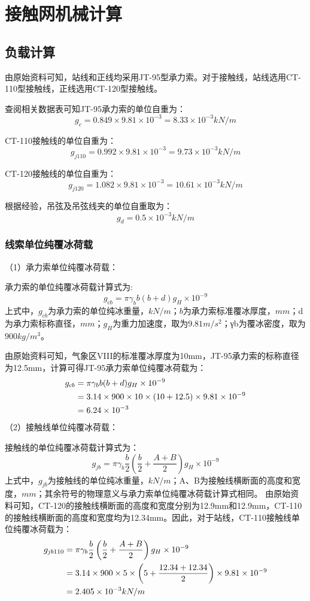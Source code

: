 \chapter{接触网机械计算}

\section{负载计算}
由原始资料可知，站线和正线均采用JT-95型承力索。对于接触线，站线选用CT-110型接触线，正线选用CT-120型接触线。

查阅相关数据表可知JT-95承力索的单位自重为：
$$
g_c=0.849\times 9.81\times 10^{-3}=8.33\times 10^{-3}\mathrm{ }k{{N}/{m}}
$$

CT-110接触线的单位自重为：
$$
g_{j110}=0.992\times 9.81\times 10^{-3}=9.73\times 10^{-3}\mathrm{ }k{{N}/{m}}
$$

CT-120接触线的单位自重为：
$$
g_{j120}=1.082\times 9.81\times 10^{-3}=10.61\times 10^{-3}\mathrm{ }k{{N}/{m}}
$$

根据经验，吊弦及吊弦线夹的单位自重取为：
$$
g_d=0.5\times 10^{-3}k{{N}/{m}}
$$

\subsection{线索单位纯覆冰荷载}
（1）承力索单位纯覆冰荷载：

承力索的单位纯覆冰荷载计算式为:
$$
g_{cb}=\pi \gamma _bb(b+d)g_H\times 10^{-9}
$$
上式中，$g_{cb}$为承力索的单位纯冰重量，$kN/m$；$b$为承力索标准覆冰厚度，$mm$；$ $d为承力索标称直径，$mm$；$g_H$为重力加速度，取为$9.81m/s^2$；γb为覆冰密度，取为$900kg/m^3$。

由原始资料可知，气象区VIII的标准覆冰厚度为10mm，JT-95承力索的标称直径为12.5mm，计算可得JT-95承力索单位纯覆冰荷载为：
\begin{align}
	g_{cb}&=\pi \gamma _bb(b+d)g_H\times 10^{-9}\notag
	\\
	&=3.14\times 900\times 10\times \left( 10+12.5 \right) \times 9.81\times 10^{-9}\notag
	\\
	&=6.24\times 10^{-3}\notag
\end{align}
（2）接触线单位纯覆冰荷载：

接触线的单位纯覆冰荷载计算式为：
$$
g_{jb}=\pi \gamma _b\frac{b}{2}(\frac{b}{2}+\frac{A+B}{2})g_H\times 10^{-9}
$$
上式中，$g_{jb}$为接触线的单位纯冰重量，$kN/m$；A、B为接触线横断面的高度和宽度，$mm$；其余符号的物理意义与承力索单位纯覆冰荷载计算式相同。
由原始资料可知，CT-120的接触线横断面的高度和宽度分别为12.9mm和12.9mm，CT-110的接触线横断面的高度和宽度均为12.34mm。因此，对于站线，CT-110接触线单位纯覆冰荷载为：
\begin{align}
g_{jb110}&=\pi \gamma _b\frac{b}{2}\left( \frac{b}{2}+\frac{A+B}{2} \right) g_H\times 10^{-9}\notag
\\
&=3.14\times 900\times 5\times \left( 5+\frac{12.34+12.34}{2} \right) \times 9.81\times 10^{-9}\notag
\\
&=2.405\times 10^{-3}kN/m\notag
\end{align}

